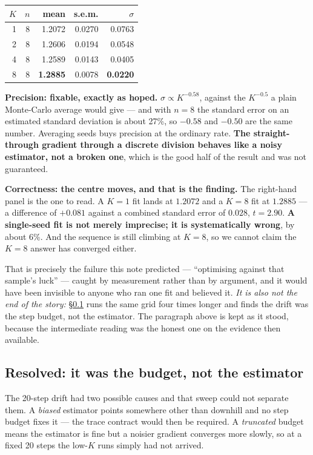 \documentclass[11pt,a4paper]{article}
\begin{document}
\begin{center}
\small
\begin{tabular}{@{}r r r r r@{}}
\toprule
$K$ & $n$ & mean & s.e.m. & $\sigma$\\
\midrule
1 & 8 & 1.2072 & 0.0270 & 0.0763\\
2 & 8 & 1.2606 & 0.0194 & 0.0548\\
4 & 8 & 1.2589 & 0.0143 & 0.0405\\
8 & 8 & \textbf{1.2885} & 0.0078 & \textbf{0.0220}\\
\bottomrule
\end{tabular}
\end{center}

\textbf{Precision: fixable, exactly as hoped.} $\sigma \propto K^{-0.58}$, against the $K^{-0.5}$ a
plain Monte-Carlo average would give --- and with $n=8$ the standard error on an estimated
standard deviation is about 27\%, so $-0.58$ and $-0.50$ are the same number. Averaging seeds buys
precision at the ordinary rate. \textbf{The straight-through gradient through a discrete division
behaves like a noisy estimator, not a broken one}, which is the good half of the result and was
not guaranteed.

\textbf{Correctness: the centre moves, and that is the finding.} The right-hand panel is the one
to read. A $K=1$ fit lands at $1.2072$ and a $K=8$ fit at $1.2885$ --- a difference of $+0.081$
against a combined standard error of $0.028$, $t = 2.90$. \textbf{A single-seed fit is not merely
imprecise; it is systematically wrong}, by about 6\%. And the sequence is still climbing at
$K=8$, so we cannot claim the $K=8$ answer has converged either.

That is precisely the failure this note predicted --- ``optimising against that sample's luck'' ---
caught by measurement rather than by argument, and it would have been invisible to anyone who ran
one fit and believed it. \emph{It is also not the end of the story:}
\S\ref{sec:p6verdict} runs the same grid four times longer and finds the drift was the step
budget, not the estimator. The paragraph above is kept as it stood, because the intermediate
reading was the honest one on the evidence then available.

\subsection{Resolved: it was the budget, not the estimator}\label{sec:p6verdict}

The 20-step drift had two possible causes and that sweep could not separate them. A \emph{biased}
estimator points somewhere other than downhill and no step budget fixes it --- the trace contract
would then be required. A \emph{truncated} budget means the estimator is fine but a noisier
gradient converges more slowly, so at a fixed 20 steps the low-$K$ runs simply had not arrived.
\end{document}

